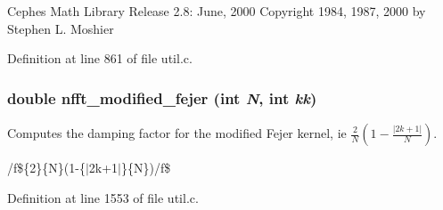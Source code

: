 Cephes Math Library Release 2.8: June, 2000 Copyright 1984, 1987, 2000 by Stephen L. Moshier 

Definition at line 861 of file util.c.\hypertarget{group__nfftutil_ga50}{
\subsubsection[nfft\_\-modified\_\-fejer]{\setlength{\rightskip}{0pt plus 5cm}double nfft\_\-modified\_\-fejer (int {\em N}, int {\em kk})}}
\label{group__nfftutil_ga50}


Computes the damping factor for the modified Fejer kernel, ie $\frac{2}{N}\left(1-\frac{\left|2k+1\right|}{N}\right)$. 

/f\$\{2\}\{N\}(1-\{$|$2k+1$|$\}\{N\})/f\$ 

Definition at line 1553 of file util.c.